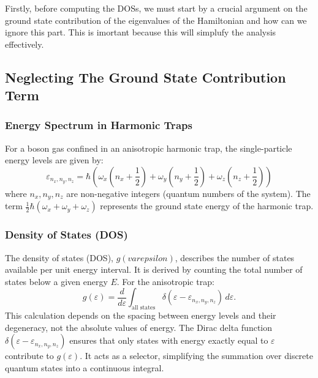 \documentclass{article}
\numberwithin{equation}{section}
\numberwithin{equation}{subsection}
\begin{document}
Firstly, before computing the DOSs, we must start by a crucial argument on the ground state contribution of the eigenvalues of the Hamiltonian and how can we ignore this part. This is imortant because this will simplufy the analysis effectively.
\subsection{Neglecting The Ground State Contribution Term}
\subsubsection{Energy Spectrum in Harmonic Traps}
For a boson gas confined in an anisotropic harmonic trap, the single-particle energy levels are given by:
\[
    \varepsilon_{\mathit{n}_{\mathit{x}},\mathit{n}_{\mathit{y}},\mathit{n}_{\mathit{z}}} = \hbar\left(\omega_{\mathit{x}}\left(\mathit{n}_{\mathit{x}}+\frac{1}{2}\right)+\omega_{\mathit{y}}\left(\mathit{n}_{\mathit{y}}+\frac{1}{2}\right)+\omega_{\mathit{z}}\left(\mathit{n}_{\mathit{z}}+\frac{1}{2}\right)\right)
\]
where \( \mathit{n}_{\mathit{x}},\mathit{n}_{\mathit{y}},\mathit{n}_{\mathit{z}} \) are non-negative integers (quantum numbers of the system). The term \( \frac{1}{2} \hbar (\omega_{\mathit{x}} + \omega_{\mathit{y}} + \omega_{\mathit{z}}) \) represents the ground state energy of the harmonic trap.

\subsubsection{Density of States (DOS)}
The density of states (DOS), \( g(varepsilon) \), describes the number of states available per unit energy interval. It is derived by counting the total number of states below a given energy \( E \). For the anisotropic trap:
\[
g(\varepsilon) = \frac{d}{d\varepsilon} \int_{\text{all states}} \delta(\varepsilon - \varepsilon_{\mathit{n}_{\mathit{x}},\mathit{n}_{\mathit{y}},\mathit{n}_{\mathit{z}}}) \, d\varepsilon.
\]
This calculation depends on the spacing between energy levels and their degeneracy, not the absolute values of energy.
The Dirac delta function \( \delta(\varepsilon - \varepsilon_{\mathit{n}_{\mathit{x}},\mathit{n}_{\mathit{y}},\mathit{n}_{\mathit{z}}}) \) ensures that only states with energy exactly equal to \( \varepsilon \) contribute to \( g(\varepsilon) \). It acts as a selector, simplifying the summation over discrete quantum states into a continuous integral.
\end{document}
